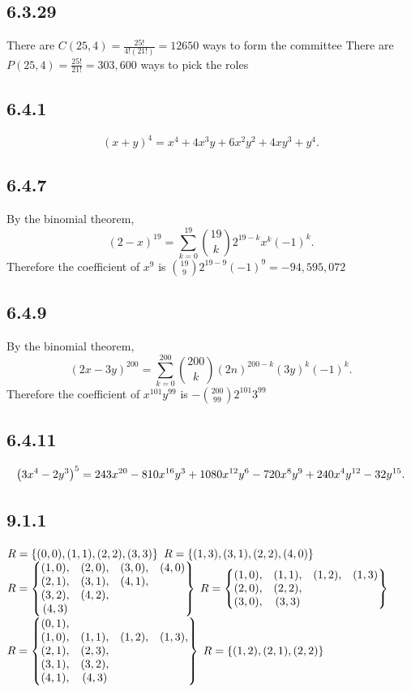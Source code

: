 \documentclass[12pt,titlepage]{extarticle}
\begin{document}
\subsection*{6.3.29}
\begin{tasks}
    \task There are $C(25, 4) = \frac{25!}{4!(21!)} = 12650$ ways to form the committee
    \task There are $P(25, 4) = \frac{25!}{21!} = 303,600$ ways to pick the roles
\end{tasks}

\subsection*{6.4.1}
\[
    (x+y)^4 = x^4 + 4x^3y + 6x^2y^2 + 4xy^3 + y^4
.\]

\subsection*{6.4.7}
By the binomial theorem,
\[
    (2-x)^{19} = \sum_{k=0}^{19} \binom{19}{k} 2^{19-k} x^k (-1)^k
.\]
Therefore the coefficient of $x^9$ is $\binom{19}{9} 2^{19-9}(-1)^9 = -94,595,072$

\subsection*{6.4.9}
By the binomial theorem,
\[
    (2x-3y)^{200} = \sum_{k=0}^{200} \binom{200}{k} (2n)^{200-k} (3y)^{k} (-1)^k
.\]
Therefore the coefficient of $x^{101} y^{99}$ is $-\binom{200}{99} 2^{101} 3^{99}$

\subsection*{6.4.11}
\[
    \qty(3x^4 - 2y^3)^5 = 243 x^{20} - 810 x^{16} y^3 + 1080 x^{12} y^6 - 720 x^8 y^9 + 240 x^4 y^{12} - 32 y^{15}
.\]

\subsection*{9.1.1}
\begin{tasks}
    \task $R = \qty{(0,0), (1,1), (2,2), (3,3)}$
    \task $R = \qty{(1,3), (3,1), (2,2), (4,0)}$
    \task $R = \displaystyle \left\{ \mqty{
            (1,0), &(2,0), &(3,0), &(4,0) \\
            (2,1), &(3,1), &(4,1), \\
            (3,2), &(4,2), \\
            (4,3)
    } \right\}$
    \task $R = \displaystyle \left\{ \mqty{
            (1,0), &(1,1), &(1,2), &(1,3) \\
            (2,0), &(2,2), \\
            (3,0), &(3,3)
    } \right\}$
    \task $R = \displaystyle \left\{ \mqty{
            (0,1),& \\
            (1,0),& (1,1),& (1,2),& (1,3), \\
            (2,1),& (2,3), \\
            (3,1),& (3,2), \\
            (4,1),& (4,3)
    } \right\}$
    \task $R = \qty{(1,2), (2,1), (2,2)}$
\end{tasks}
\end{document}
